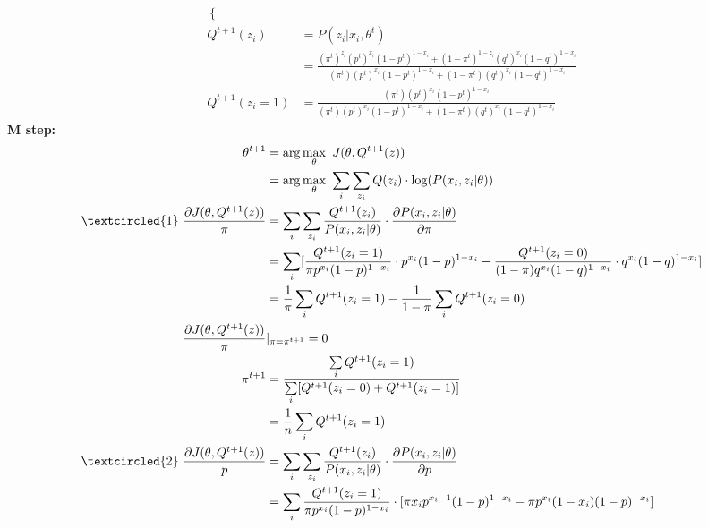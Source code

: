 \documentclass[fleqn,answers]{exam}
\begin{document}
\begin{questions}
\begin{solution}
\begin{align*}
\begin{cases}
            \end{cases}\\
        Q^{t+1}(z_i)&=P(z_i \vert x_i,\theta^t)\\
            &=\frac{
                (\pi^t)^{z_i} (p^t)^{x_i} (1-p^t)^{1-x_i} +
                (1-\pi^t)^{1-z_i} (q^t)^{x_i} (1-q^t)^{1-x_i}
            }
            {
                (\pi^t) (p^t)^{x_i} (1-p^t)^{1-x_i} +
                (1-\pi^t) (q^t)^{x_i} (1-q^t)^{1-x_i}
            }\\
        Q^{t+1}(z_i=1)&=\frac{(\pi^t) (p^t)^{x_i} (1-p^t)^{1-x_i}}
        {
            (\pi^t) (p^t)^{x_i} (1-p^t)^{1-x_i} +
            (1-\pi^t) (q^t)^{x_i} (1-q^t)^{1-x_i}
        }
    \end{align*}
    \textbf{M step:}
    \begin{align*}
        \theta^{t+1}&=\arg\max\limits_\theta ~ J(\theta,Q^{t+1}(z))\\
            &=\arg\max\limits_\theta ~ \sum\limits_i \sum\limits_{z_i} Q(z_i) \cdot \log(P(x_i,z_i \vert \theta))\\
        \textcircled{1}~
        \frac{\partial J(\theta,Q^{t+1}(z))}{\pi}&=\sum\limits_i \sum\limits_{z_i} \frac{Q^{t+1}(z_i)}{P(x_i,z_i \vert \theta)} \cdot \frac{\partial P(x_i,z_i \vert \theta)}{\partial \pi}\\
            &=\sum\limits_i [
                \frac{Q^{t+1}(z_i=1)}{\pi p^{x_i} (1-p)^{1-x_i}} \cdot p^{x_i} (1-p)^{1-x_i} -
                \frac{Q^{t+1}(z_i=0)}{(1-\pi) q^{x_i} (1-q)^{1-x_i}} \cdot q^{x_i} (1-q)^{1-x_i}
            ]\\
            &=\frac{1}{\pi} \sum\limits_i Q^{t+1}(z_i=1) - \frac{1}{1-\pi} \sum\limits_i Q^{t+1}(z_i=0)\\
        \frac{\partial J(\theta,Q^{t+1}(z))}{\pi}& \vert_{\pi=\pi^{t+1}}=0\\
        \pi^{t+1}&=\frac{\sum\limits_i Q^{t+1}(z_i=1)}{\sum\limits_i [Q^{t+1}(z_i=0)+Q^{t+1}(z_i=1)]}\\
            &=\frac{1}{n} \sum\limits_i Q^{t+1}(z_i=1)\\
        \textcircled{2}~
        \frac{\partial J(\theta,Q^{t+1}(z))}{p}&=\sum\limits_i \sum\limits_{z_i} \frac{Q^{t+1}(z_i)}{P(x_i,z_i \vert \theta)} \cdot \frac{\partial P(x_i,z_i \vert \theta)}{\partial p}\\
            &=\sum\limits_i
                \frac{Q^{t+1}(z_i=1)}{\pi p^{x_i} (1-p)^{1-x_i}} \cdot
                    [ \pi x_i p^{x_i-1} (1-p)^{1-x_i} - \pi p^{x_i} (1-x_i) (1-p)^{-x_i}]\\

\end{align*}
\end{solution}
\end{questions}
\end{document}
